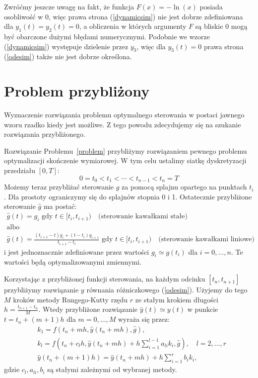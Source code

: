 \documentclass[licencjacka]{pracamgr}
\begin{document}
Zwróćmy jeszcze uwagę na fakt, że funkcja $F(x) = -\ln(x)$ posiada osobliwość w 0, więc prawa strona (\ref{dynamicsim}) nie jest dobrze zdefiniowana dla $y_1(t) = y_2(t) = 0$, a obliczenia w których argumenty $F$ są bliskie 0 mogą być obarczone dużymi błędami numerycznymi. Podobnie we wzorze (\ref{dynamicsim}) występuje dzielenie przez $y_3$, więc dla $y_3(t) = 0$ prawa strona (\ref{odesim}) także nie jest dobrze określona.

\section{Problem przybliżony}\label{simp_problem_subsec}
Wyznaczenie rozwiązania problemu optymalnego sterowania w postaci jawnego wzoru rzadko kiedy jest możliwe. Z tego powodu zdecydujemy się na szukanie rozwiązania przybliżonego.

Rozwiązanie Problemu~\ref{problem} przybliżymy rozwiązaniem pewnego problemu optymalizacji skończenie wymiarowej. W tym celu ustalimy siatkę dyskretyzacji przedziału $[0, T]$:
\begin{equation}
  0 = t_0 < t_1 < \cdots < t_{n-1} < t_n = T
\end{equation}
Możemy teraz przybliżać sterowanie $g$ za pomocą splajnu opartego na punktach $t_{i}$. Dla prostoty ograniczymy się do splajnów stopnia 0 i 1. Ostatecznie przybliżone sterowanie $\hat{g}$ ma postać:
\begin{gather}  
    \hat{g}(t) = g_i \text{ gdy } t \in [t_{i}, t_{i + 1}) \quad \text{(sterowanie kawałkami stałe)} \label{control_1}\\
    \nonumber \text{albo} \\
    \hat{g}(t) = \frac{(t_{i+1} - t)g_i + (t - t_i)g_{i+1}}{t_{i+1} - t_i} \text{ gdy } t \in [t_i, t_{i+1}) \quad \text{(sterowanie kawałkami liniowe)} \label{control_2}
\end{gather}
i jest jednoznacznie zdefiniowane przez wartości $g_i \simeq g(t_i)$ dla $i = 0,\ldots, n$. Te wartości będą optymalizowanymi zmiennymi.

Korzystając z przybliżonej funkcji sterowania, na każdym odcinku $[t_n, t_{n+1}]$ przybliżymy rozwiązanie $y$ równania różniczkowego (\ref{odesim}). Użyjemy do tego $M$ kroków metody Rungego-Kutty rzędu $r$ ze stałym krokiem długości $h = \frac{t_{n+1} - t_n}{M}$. Wtedy przybliżone rozwiązanie $\hat{y}(t) \simeq y(t)$ w punkcie $t = t_n + (m + 1)h$ dla $m = 0,\ldots, M$  wyraża się przez:
\begin{equation} \label{rk}
  \begin{split}
    &k_1 = f(t_n + mh, \hat{y}(t_n + mh), \hat{g}), \\
    &k_l = f(t_n + c_l h, \hat{y}(t_n + mh) + h \sum_{i = 1}^{l-1} a_{li}k_i, \hat{g}),\quad l = 2,\ldots, r \\
    &\hat{y}(t_n + (m+1)h) = \hat{y}(t_n + mh) + h \sum_{i = 1}^r b_i k_i,
  \end{split}
\end{equation}
gdzie $c_l, a_{li}, b_i$ są stałymi zależnymi od wybranej metody.
\end{document}
